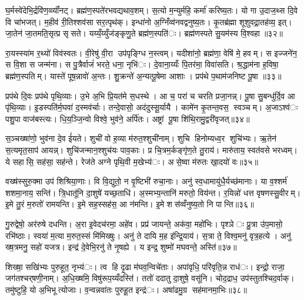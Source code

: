 घ॒र्मस्वे॑देभि॒र्द्रवि॑ण॒व्व्याँ॑नट्। ब्रह्म॑ण॒स्पते॑रभवद्यथाव॒शम्। स॒त्यो म॒न्युर्महि॒ कर्मा॑ करिष्य॒तः। यो गा उ॒दाज॒थ्स दि॒वे वि चा॑भजत्। म॒हीव॑ री॒तिश्शव॑सा सर॒त्पृथ॑क्। इन्धा॑नो अ॒ग्निँव्व॑नवद्वनुष्य॒तः। कृ॒तब्र॑ह्मा शूशुवद्रा॒तह॑व्य॒ इत्। जा॒तेन॑ जा॒तमति॒सृत्प्र सृसते। यय्यँ॒य्युँज॑ङ्कृणु॒ते ब्रह्म॑ण॒स्पति॑ः। ब्रह्म॑णस्पते सु॒यम॑स्य वि॒श्वहा॥३२॥

रा॒यस्स्या॑म र॒थ्यो॑ विव॑स्वतः। वी॒रेषु॑ वी॒रा उप॑पृङ्ग्धि न॒स्त्वम्। यदीशा॑नो॒ ब्रह्म॑णा॒ वेषि॑ मे॒ हवम्। स इज्जने॑न॒ स वि॒शा स जन्म॑ना। स पु॒त्रैर्वाजं॑ भरते॒ धना॒ नृभि॑ः। दे॒वाना॒य्यँः पि॒तर॑मा॒ विवा॑सति। श्र॒द्धाम॑ना ह॒विषा॒ ब्रह्म॑ण॒स्पतिम्। यास्ते॑ पूष॒न्नावो॑ अ॒न्तः। शु॒क्रन्ते॑ अ॒न्यत्पू॒षेमा आशाः। प्रप॑थे प॒थाम॑जनिष्ट पू॒षा ॥३३॥

प्रप॑थे दि॒वः प्रप॑थे पृथि॒व्याः। उ॒भे अ॒भि प्रि॒यत॑मे स॒धस्थे। आ च॒ परा॑ च चरति प्रजा॒नन्न्। पू॒षा सु॒बन्धु॑र्दि॒व आ पृ॑थि॒व्याः। इ॒डस्पति॑र्म॒घवा॑ द॒स्मव॑र्चाः। तन्दे॒वासो॒ अद॑दुस्सू॒र्यायै। कामे॑न कृ॒तन्त॒वस॒ स्वञ्चम्। अ॒जाऽश्व॑ः पशु॒पा वाज॑बस्त्यः। धि॒य॒ञ्जि॒न्वो विश्वे॒ भुव॑ने॒ अर्पि॑तः। अष्ट्रां पू॒षा शि॑थि॒रामु॒द्वरी॑वृजत्॥३४॥

स॒ञ्चख्षा॑णो॒ भुव॑ना दे॒व ई॑यते। शुची॑ वो ह॒व्या म॑रुत॒श्शुची॑नाम्। शुचि हिनोम्यध्व॒र शुचि॑भ्यः। ऋ॒तेन॑ स॒त्यमृत॒साप॑ आयन्न्। शुचि॑जन्मान॒श्शुच॑यः पाव॒काः। प्र चि॒त्रम॒र्कङ्गृ॑ण॒ते तु॒राय॑। मारु॑ताय॒ स्वत॑वसे भरध्वम्। ये सहासि॒ सह॑सा॒ सह॑न्ते। रेज॑ते अग्ने पृथि॒वी म॒खेभ्य॑ः। असे॒ष्वा म॑रुतः खा॒दयो॑ वः॥३५॥

वख्ष॑स्सुरु॒क्मा उप॑ शिश्रिया॒णाः। वि वि॒द्युतो॒ न वृ॒ष्टिभी॑ रुचा॒नाः। अनु॑ स्व॒धामायु॑धै॒र्यच्छ॑मानाः। या व॒श्शर्म॑ शशमा॒नाय॒ सन्ति॑। त्रि॒धातू॑नि दा॒शुषे॑ यच्छ॒ताधि॑। अ॒स्मभ्य॒न्तानि॑ मरुतो॒ विय॑न्त। र॒यिन्नो॑ धत्त वृषणस्सु॒वीरम्। इ॒मे तु॒रं म॒रुतो॑ रामयन्ति। इ॒मे सह॒स्सह॑स॒ आ न॑मन्ति। इ॒मे शस॑व्वँनुष्य॒तो नि पान्ति॥३६॥

गु॒रुद्वेषो॒ अर॑रुषे दधन्ति। अ॒रा इ॒वेदच॑रमा॒ अहे॑व। प्रप्र॑ जायन्ते॒ अक॑वा॒ महो॑भिः। पृश्ञेः प्रु॒त्रा उ॑प॒मासो॒ रभि॑ष्ठाः। स्वया॑ म॒त्या म॒रुत॒स्सं मि॑मिख्षुः। अनु॑ ते दायि म॒ह इ॑न्द्रि॒याय॑। स॒त्रा ते॒ विश्व॒मनु॑ वृत्र॒हत्ये। अनु॑ ख्ष॒त्रमनु॒ सहो॑ यजत्र। इन्द्र॑ दे॒वेभि॒रनु॑ ते नृ॒षह्ये। य इन्द्र॒ शुष्मो॑ मघवन्ते॒ अस्ति॑॥३७॥

शिख्षा॒ सखि॑भ्यः पुरुहूत॒ नृभ्य॑ः। त्व हि दृ॒ढा म॑घव॒न्विचे॑ताः। अपा॑वृधि॒ परि॑वृति॒न्न राध॑ः। इन्द्रो॒ राजा॒ जग॑तश्चर्‌षणी॒नाम्। अ॒धि॒ख्षमि॒ विषु॑रूप॒य्यँदस्ति॑। ततो॑ ददातु दा॒शुषे॒ वसू॑नि। चोद॒द्राध॒ उप॑स्तुतश्चिद॒र्वाक्। तमु॑ष्टुहि॒ यो अ॒भिभूत्योजाः। व॒न्वन्नवा॑तः पुरुहू॒त इन्द्र॑ः। अषा॑ढमु॒ग्र सह॑मानमा॒भिः॥३८॥

